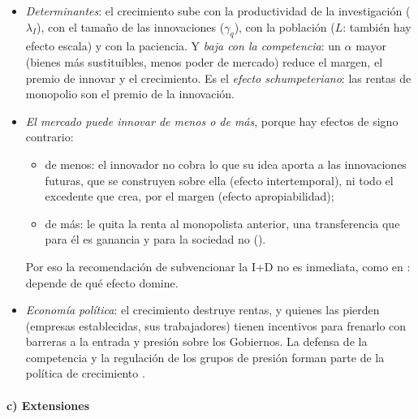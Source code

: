 \documentclass[11pt]{article}
\begin{document}
\begin{itemize}
\item \emph{Determinantes}: el crecimiento sube con la productividad de la investigación ($\lambda_I$), con el tamaño de las innovaciones ($\gamma_q$), con la población ($L$: también hay efecto escala) y con la paciencia. Y \emph{baja con la competencia}: un $\alpha$ mayor (bienes más sustituibles, menos poder de mercado) reduce el margen, el premio de innovar y el crecimiento. Es el \emph{efecto schumpeteriano}: las rentas de monopolio son el premio de la innovación.
\item \emph{El mercado puede innovar de menos o de más}, porque hay efectos de signo contrario:
  \begin{itemize}
  \item de menos: el innovador no cobra lo que su idea aporta a las innovaciones futuras, que se construyen sobre ella (efecto intertemporal), ni todo el excedente que crea, por el margen (efecto apropiabilidad);
  \item de más: le quita la renta al monopolista anterior, una transferencia que para él es ganancia y para la sociedad no ().
  \end{itemize}
  Por eso la recomendación de subvencionar la I+D no es inmediata, como en : depende de qué efecto domine.
\item \emph{Economía política}: el crecimiento destruye rentas, y quienes las pierden (empresas establecidas, sus trabajadores) tienen incentivos para frenarlo con barreras a la entrada y presión sobre los Gobiernos. La defensa de la competencia y la regulación de los grupos de presión forman parte de la política de crecimiento  .
\end{itemize}

\paragraph{c) Extensiones}
\end{document}
